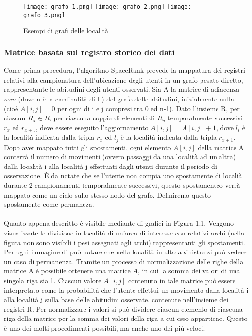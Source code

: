 \begin{figure}
  \centering

  \texttt{[image: grafo\_1.png]}
  \texttt{[image: grafo\_2.png]}
  \texttt{[image: grafo\_3.png]}

  \caption[Fig 1.1]{Esempi di grafi delle localit\`a}
  \label{fig2.1}
\end{figure}

\subsubsection{Matrice basata sul registro storico dei dati}
Come prima procedura, l'algoritmo SpaceRank prevede la mappatura
dei registri relativi alla campionatura dell'ubicazione degli utenti in un grafo
pesato diretto, rappresentante le abitudini degli utenti osservati.
Sia A la matrice di adiacenza $n x n$ (dove n \`e la cardinalit\`a di L) del
grafo delle abitudini, inizialmente nulla (cio\`e $A[i, j] = 0$ per ogni di i e j
compresi tra 0 ed n-1). Dato l'insieme R, per ciascun $R_{u} \in R$, per ciascuna
coppia di elementi di $R_{u}$ temporalmente successivi $r_{x}$ ed $r_{x+1}$, deve essere eseguito
l'aggiornamento $A[i, j] = A[i, j] + 1$, dove $l_{i}$ \`e la localit\`a indicata dalla
tripla $r_{x}$ ed $l_{j}$ \`e la localit\`a indicata dalla tripla $r_{x+1}$.
Dopo aver mappato tutti gli spostamenti, ogni elemento $A[i, j]$ della matrice A
conterr\`a il numero di movimenti (ovvero passaggi da una localit\`a ad un'altra)
dalla localit\`a i alla localit\`a j effettuati dagli utenti durante il periodo di osservazione.
\`E da notate che se l'utente non compia uno spostamente di locali\`a durante 2 campionamenti
temporalmente successivi, questo spostamenteo verr\`a mappato come un ciclo sullo
stesso nodo del grafo. Definiremo questo spostamente come permaneza.\\
\\
Quanto appena descritto \`e visibile mediante di grafici in Figura 1.1.
Vengono visualizzate le divisione in localit\`a di un'area di interesse con
relativi archi (nella figura non sono visibili i pesi assegnati agli archi) rappresentanti
gli spostamenti. Per ogni immagine di pu\`o notare che nella localit\`a in alto a
sinistra si pu\`o vedere un caso di permanenza.
Tramite un processo di normalizzazione delle righe della matrice A \`e possibile
ottenere una matrice $\bar{A}$, in cui la somma dei valori di una singola riga sia 1.
Ciascun valore $\bar{A}[i, j]$ contenuto in tale matrice pu\`o essere interpretato come
la probabilit\`a che l'utente effettui un movimento dalla localit\`a i alla localit\`a
j sulla base delle abitudini osservate, contenute nell'insieme dei registri R.
Per normalizzare i valori si pu\`o dividere ciascun elemento di ciascuna riga della
matrice per la somma dei valori della riga a cui esso appartiene. Questo \`e uno
dei molti procedimenti possibili, ma anche uno dei pi\`u veloci.

